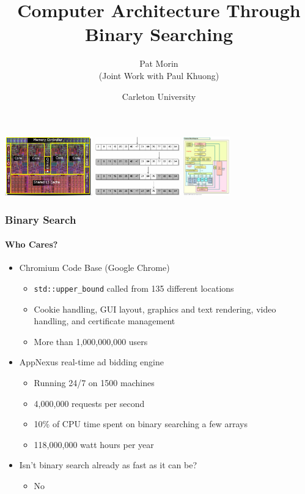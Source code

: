 \documentclass[xcolor=dvipsnames]{beamer}
\title{Computer Architecture Through Binary Searching}
\author{Pat Morin \\ (Joint Work with Paul Khuong)}
\date{Carleton University}
\begin{document}
\begin{frame}
  \titlepage
  \centerline{
    \includegraphics[height=1in]{images/nehalemdie}
    \includegraphics[height=1in]{images/binary-search}
    \includegraphics[height=1in]{images/nehalem-block}
  }
\end{frame}


\begin{frame}
  \frametitle{Binary Search}
  \framesubtitle{Who Cares?}

  \begin{itemize}[<+->]
    \item Chromium Code Base (Google Chrome)
    \begin{itemize}
       \item \texttt{std::upper_bound} called from 135 different locations
       \item Cookie handling, GUI layout, graphics and text rendering, video handling, and certificate management
       \item More than 1,000,000,000 users
    \end{itemize}
    \item AppNexus real-time ad bidding engine
    \begin{itemize}
       \item Running 24/7 on 1500 machines
       \item 4,000,000 requests per second
       \item 10\% of CPU time spent on binary searching a few arrays
       \item 118,000,000 watt hours per year
    \end{itemize}
    \item Isn't binary search already as fast as it can be?
    \begin{itemize}
       \item No
    \end{itemize}

  \end{itemize}
\end{frame}
\end{document}
